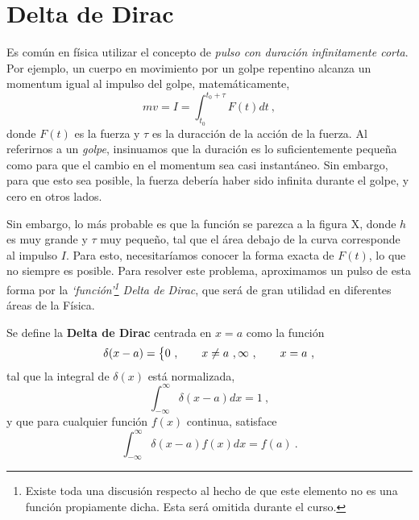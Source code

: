 \section{Delta de Dirac}

Es común en física utilizar el concepto de \emph{pulso con duración infinitamente corta}. Por ejemplo, un cuerpo en movimiento por un golpe repentino alcanza un momentum igual al impulso del golpe, matemáticamente,
\begin{equation*}
    mv = I = \int_{t_0}^{t_0+\tau} F(t) dt \ ,
\end{equation*}
donde $F(t)$ es la fuerza y $\tau$ es la duracción de la acción de la fuerza. Al referirnos a un \emph{golpe}, insinuamos que la duración es lo suficientemente pequeña como para que el cambio en el momentum sea casi instantáneo. Sin embargo, para que esto sea posible, la fuerza debería haber sido infinita durante el golpe, y cero en otros lados.

Sin embargo, lo más probable es que la función se parezca a la figura X, donde $h$ es muy grande y $\tau$ muy pequeño, tal que el área debajo de la curva corresponde al impulso $I$. Para esto, necesitaríamos conocer la forma exacta de $F(t)$, lo que no siempre es posible. Para resolver este problema, aproximamos un pulso de esta forma por la \emph{`función'\footnote{Existe toda una discusión respecto al hecho de que este elemento no es una función propiamente dicha. Esta será omitida durante el curso.} Delta de Dirac}, que será de gran utilidad en diferentes áreas de la Física.

\begin{defi}
    Se define la \textbf{Delta de Dirac} centrada en $x=a$ como la función
    \begin{equation}
        \delta(x-a) = \begin{dcases}
            0 \ , \qquad x \neq a \ ,
            \infty \ , \qquad x = a \ ,
        \end{dcases}
    \end{equation}
    tal que la integral de $\delta(x)$ está normalizada,
    \begin{equation}
        \int_{-\infty}^{\infty} \delta(x-a) dx = 1 \ ,
    \end{equation}
    y que para cualquier función $f(x)$ continua, satisface
    \begin{equation}
        \int_{-\infty}^{\infty} \delta(x-a) f(x) dx = f(a) \ .
    \end{equation}
\end{defi}

